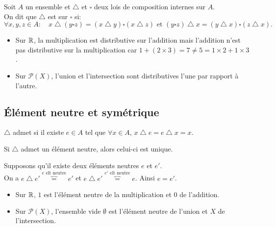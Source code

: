 \documentclass{book}
\begin{document}
\begin{Definition}
Soit $A$ un ensemble et $\bigtriangleup$ et $\square$ deux lois de composition internes sur $A$.\\
On dit que $\bigtriangleup$ est  sur $\square$ si:
$$ \forall x, y, z  \in A :\quad   x \bigtriangleup (y \square z) = (x \bigtriangleup y) \square (x \bigtriangleup z)\text{ et }(y \square z) \bigtriangleup x = (y \bigtriangleup x) \square (z \bigtriangleup x).$$
\end{Definition} 
\begin{Exemple}
\begin{itemize}
\item Sur $\mathbb{R}$, la multiplication est distributive sur l'addition mais l'addition n'est pas distributive sur la multiplication car $1+(2\times3)=7\neq 5=1\times 2+ 1\times 3$.
\item Sur  $\mathcal{P}(X)$, l'union et l'intersection sont distributives l'une par rapport à l'autre.
\end{itemize}
\end{Exemple}
\subsection{Élément neutre et symétrique}
\begin{Definition}
$\bigtriangleup$ admet  si il existe $ e\in A$ tel que $\forall x\in A$, $x \bigtriangleup e = e \bigtriangleup x = x$.
\end{Definition}
\begin{Proposition}
Si $\bigtriangleup$ admet un élément neutre, alors celui-ci est unique.
\end{Proposition}
\begin{Demonstration}
Supposons qu'il existe deux éléments neutres $ e$ et $e'$.\\
On a $e \bigtriangleup e'\overbrace{=}^{e \text{ elt neutre}}e'$ et $e \bigtriangleup e'\overbrace{=}^{e' \text{ elt neutre}}e$. Ainsi $ e=e'$.
\end{Demonstration}
\begin{Exemple}
\begin{itemize}
\item Sur $\mathbb{R}$, $1$ est l'élément neutre de la multiplication et $0$ de l'addition.
\item Sur  $\mathcal{P}(X)$, l'ensemble vide $\emptyset$ est l'élément neutre de l'union et  $X$ de  l'intersection.
\end{itemize}
\end{Exemple}
\end{document}
